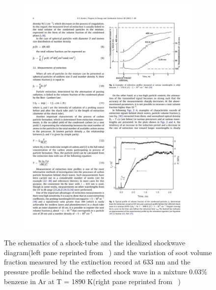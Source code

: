 \begin{figure}[!htbp]
\begin{subfigure}[t]{0.4\textwidth}
	\end{subfigure}
	\begin{subfigure}[t]{0.4\textwidth}
	\includegraphics[width=1\textwidth]{Figures/Results/Shocktube/pfv_sample_shocktube.pdf}
	\end{subfigure}
	\caption{The schematics of a shock-tube and the idealized shockwave diagram(left pane reprinted from ~\citet{kee2017chemically}) and the variation of soot volume fraction measured by the extinction record at 633 nm and the pressure profile behind the reflected shock wave in a mixture 0.03\% benzene in Ar at T = 1890 K(right pane reprinted from ~\citet{karasevich1994soot})}
	\label{fig:shocktubeschem}
\end{figure}


